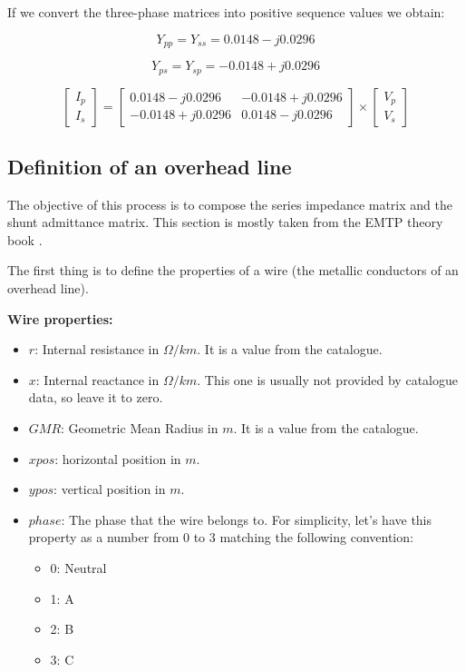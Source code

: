 \documentclass[nols,a4paper,twoside,notoc,fleqn]{tufte-book}
\begin{document}
If we convert the three-phase matrices into positive sequence values we obtain:

$$
Y_{pp} = Y_{ss} = 0.0148 -j0.0296
$$

$$
Y_{ps} = Y_{sp} = -0.0148 +j0.0296
$$


$$
\left[\begin{array}{c}
I_p \\
I_s
\end{array}\right] = \left[\begin{array}{cc}
0.0148 -j0.0296 & -0.0148 +j0.0296\\
-0.0148 +j0.0296 & 0.0148 -j0.0296
\end{array}\right] \times \left[\begin{array}{c}
V_p \\
V_s
\end{array}\right]
$$


\subsection{Definition of an overhead line}

The objective of this process is to compose the series impedance matrix and the shunt admittance matrix. This section is mostly taken from the EMTP theory book \cite{dommel1986electromagnetic}.

The first thing is to define the properties of a wire (the metallic conductors of an overhead line).  

\textbf{Wire properties:}
\begin{itemize}
	\item $r$: Internal resistance in $\Omega/km$. It is a value from the catalogue.
	\item $x$: Internal reactance in $\Omega/km$. This one is usually not provided by catalogue data, so leave it to zero.
	\item $GMR$: Geometric Mean Radius in $m$. It is a value from the catalogue.
	\item $xpos$:  horizontal position in $m$.
	\item $ypos$:  vertical position in $m$.
	\item $phase$: The phase that the wire belongs to. For simplicity, let's have this property as a number from 0 to 3 matching the following convention:
	\begin{itemize}
		\item 0: Neutral
		\item 1: A
		\item 2: B
		\item 3: C
	\end{itemize}
\end{itemize}
\end{document}
